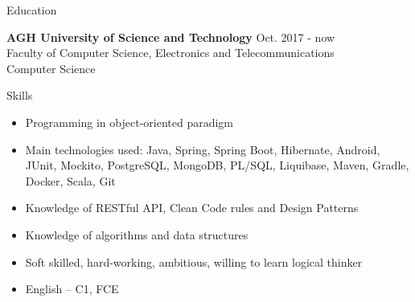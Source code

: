 \documentclass{resume} %
\begin{document}
    \begin{rSection}{Education}

    {\bf AGH University of Science and Technology} \hfill {Oct. 2017 - now}
    \\ Faculty of Computer Science, Electronics and Telecommunications
    \\ Computer Science

    \end{rSection}


    \begin{rSection}{Skills}
        \begin{itemize}
            \setlength\itemsep{-0.5em}
            \item Programming in object-oriented paradigm
            \item Main technologies used: Java, Spring, Spring Boot, Hibernate, Android, JUnit, Mockito, PostgreSQL, MongoDB, PL/SQL, Liquibase, Maven, Gradle, Docker, Scala, Git
            \item Knowledge of RESTful API, Clean Code rules and Design Patterns
            \item Knowledge of algorithms and data structures
            \item Soft skilled, hard-working, ambitious, willing to learn logical thinker
            \item English – C1, FCE
        \end{itemize}
    \end{rSection}


\end{document}

